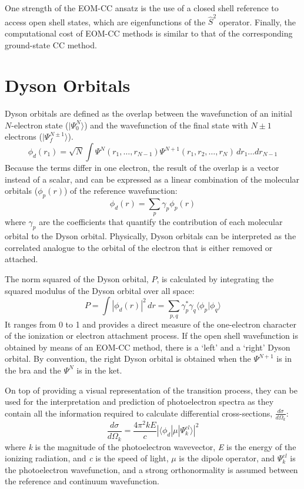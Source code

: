 One strength of the EOM-CC ansatz is the use of a closed shell reference to access open shell states, which are eigenfunctions of the $\hat{S}^2$ operator. Finally, the computational cost of EOM-CC methods is similar to that of the corresponding ground-state CC method.

\section{Dyson Orbitals}

Dyson orbitals\cite{jagau2016characterizing,melania2007dyson} are defined as the overlap between the wavefunction of an initial $N$-electron state ($|\Psi_0^N\rangle$) and the wavefunction of the final state with $N\pm1$ electrons ($|\Psi_f^{N\pm1}\rangle$).
\begin{equation}
    \phi_{d}(r_1) = \sqrt{N} \int \Psi^{N}(r_1,\dots,r_{N-1}) \Psi^{N+1}(r_1, r_2,\dots,r_N)\,dr_1 \dots dr_{N-1}
\end{equation}
Because the terms differ in one electron, the result of the overlap is a vector instead of a scalar, and can be expressed as a linear combination of the molecular orbitals ($\phi_p(r)$) of the reference wavefunction:
\begin{equation}
    \phi_{d}(r) = \sum_p \gamma_p \phi_p(r)
\end{equation}
where $\gamma_p$ are the coefficients that quantify the contribution of each molecular orbital to the Dyson orbital. Physically, Dyson orbitals can be interpreted as the correlated analogue to the orbital of the electron that is either removed or attached.

The norm squared of the Dyson orbital, $P$, is calculated by integrating the squared modulus of the Dyson orbital over all space:
\begin{equation}
    P = \int |\phi_{d}(r)|^2 \,dr = \sum_{p,q} \gamma_p^* \gamma_q \langle \phi_p | \phi_q \rangle
\end{equation}
It ranges from 0 to 1 and provides a direct measure of the one-electron character of the ionization or electron attachment process. If the open shell wavefunction is obtained by means of an EOM-CC method, there is a `left' and a `right' Dyson orbital. By convention, the right Dyson orbital is obtained when the $\Psi^{N+1}$ is in the bra and the $\Psi^{N}$ is in the ket. 

On top of providing a visual representation of the transition process, they can be used for the interpretation and prediction of photoelectron spectra as they contain all the information required to calculate differential cross-sections, $\frac{d\sigma}{d\Omega_k}$:
\begin{equation}
    \frac{d\sigma}{d\Omega_k} = \frac{4\pi^2kE}{c}|\langle \phi_d | \mu | \Psi^{el}_k \rangle |^2
\end{equation}
where \textit{k} is the magnitude of the photoelectron wavevector, \textit{E} is the energy of the ionizing radiation, and \textit{c} is the speed of light, $\mu$ is the dipole operator, and $\Psi^{el}_k$ is the photoelectron wavefunction, and a strong orthonormality is assumed between the reference and continuum wavefunction.  

